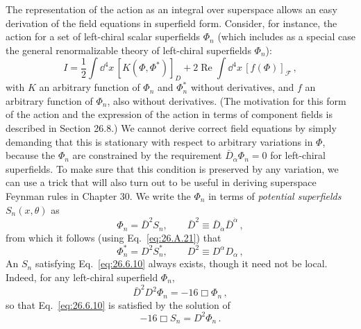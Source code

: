 The representation of the action as an integral over superspace allows an
easy derivation of the field equations in superfield form. Consider, for
instance, the action for a set of left-chiral scalar superfields \(\Phi_n\)
(which includes as a special case the general renormalizable theory of
left-chiral superfields \(\Phi_n\)):
\begin{equation}
  I
  =\frac12\int \dd^4x\,[K(\Phi,\Phi^*)]_D
   +2\operatorname{Re}\int \dd^4x\,[f(\Phi)]_{\mathcal{F}}\,,
  \tag{26.6.9}\label{eq:26.6.9}
\end{equation}
with \(K\) an arbitrary function of \(\Phi_n\) and \(\Phi_n^*\) without
derivatives, and \(f\) an arbitrary function of \(\Phi_n\), also without
derivatives. (The motivation for this form of the action and the expression of
the action in terms of component fields is described in Section 26.8.) We
cannot derive correct field equations by simply demanding that this is
stationary with respect to arbitrary variations in \(\Phi\), because the
\(\Phi_n\) are constrained by the requirement
\(\bar D_{\dot\alpha}\Phi_n=0\) for left-chiral superfields. To make sure
that this condition is preserved by any variation, we can use a trick that
will also turn out to be useful in deriving superspace Feynman rules in
Chapter 30. We write the \(\Phi_n\) in terms of \emph{potential superfields}
\(S_n(x,\theta)\) as
\begin{equation}
  \Phi_n=\bar D^2S_n,\qquad
  \bar D^2\equiv\bar D_{\dot\alpha}\bar D^{\dot\alpha}\,,
  \tag{26.6.10}\label{eq:26.6.10}
\end{equation}
from which it follows (using Eq.~\eqref{eq:26.A.21}) that
\begin{equation}
  \Phi_n^*=D^2S_n^*,\qquad
  D^2\equiv D^\alpha D_\alpha\,,
  \tag{26.6.11}\label{eq:26.6.11}
\end{equation}
An \(S_n\) satisfying Eq.~\eqref{eq:26.6.10} always exists, though it need
not be local. Indeed, for any left-chiral superfield \(\Phi_n\),
\begin{equation}
  \bar D^2D^2\Phi_n=-16\Box\Phi_n\,,
  \tag{26.6.12}\label{eq:26.6.12}
\end{equation}
so that Eq.~\eqref{eq:26.6.10} is satisfied by the solution of
\begin{equation}
  -16\Box S_n=D^2\Phi_n\,.
  \tag{26.6.13}\label{eq:26.6.13}
\end{equation}


